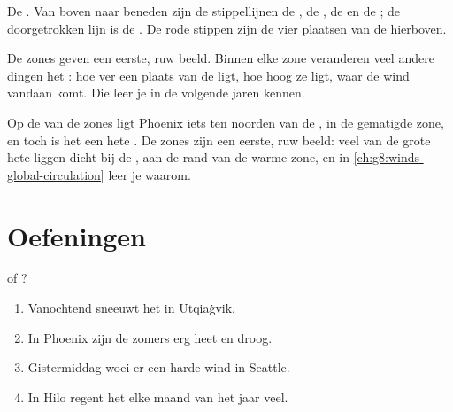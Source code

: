 \begin{omfigure}
{\small De . Van boven naar beneden zijn de stippellijnen de
, de , de  en de
; de doorgetrokken lijn is de . De rode stippen zijn
de vier plaatsen van de  hierboven.}
\end{omfigure}

De zones geven een eerste, ruw beeld. Binnen elke zone veranderen veel
andere dingen het : hoe ver een plaats van de  ligt, hoe hoog ze
ligt, waar de wind vandaan komt. Die leer je in de volgende jaren kennen.

\begin{remark}\label{rem:g5:weather-and-climate:phoenix}
Op de  van de zones ligt Phoenix iets ten noorden van de
, in de gematigde zone, en toch is het een hete .
De zones zijn een eerste, ruw beeld: veel van de grote hete 
liggen dicht bij de , aan de rand van de warme zone, en in
\cref{ch:g8:winds-global-circulation} leer je waarom.
\end{remark}

\section{Oefeningen}

\begin{exercise}[$\star$]\label{exo:g5:weather-and-climate:1}
 of ?
\begin{enumerate}
  \item[(a)] Vanochtend sneeuwt het in Utqiaġvik.
  \item[(b)] In Phoenix zijn de zomers erg heet en droog.
  \item[(c)] Gistermiddag woei er een harde wind in Seattle.
  \item[(d)] In Hilo regent het elke maand van het jaar veel.
\end{enumerate}
\end{exercise}

